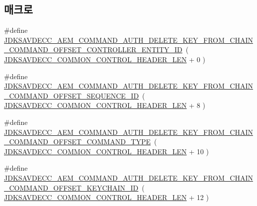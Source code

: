 \subsection*{매크로}
\begin{DoxyCompactItemize}
\item 
\#define \hyperlink{group__command__auth__delete__key__from__chain_ga7f921177819b2036037a722f26fec6b2}{J\+D\+K\+S\+A\+V\+D\+E\+C\+C\+\_\+\+A\+E\+M\+\_\+\+C\+O\+M\+M\+A\+N\+D\+\_\+\+A\+U\+T\+H\+\_\+\+D\+E\+L\+E\+T\+E\+\_\+\+K\+E\+Y\+\_\+\+F\+R\+O\+M\+\_\+\+C\+H\+A\+I\+N\+\_\+\+C\+O\+M\+M\+A\+N\+D\+\_\+\+O\+F\+F\+S\+E\+T\+\_\+\+C\+O\+N\+T\+R\+O\+L\+L\+E\+R\+\_\+\+E\+N\+T\+I\+T\+Y\+\_\+\+ID}~( \hyperlink{group__jdksavdecc__avtp__common__control__header_gaae84052886fb1bb42f3bc5f85b741dff}{J\+D\+K\+S\+A\+V\+D\+E\+C\+C\+\_\+\+C\+O\+M\+M\+O\+N\+\_\+\+C\+O\+N\+T\+R\+O\+L\+\_\+\+H\+E\+A\+D\+E\+R\+\_\+\+L\+EN} + 0 )
\item 
\#define \hyperlink{group__command__auth__delete__key__from__chain_ga7d21fc8abc9bc6a09a5f635caec467b1}{J\+D\+K\+S\+A\+V\+D\+E\+C\+C\+\_\+\+A\+E\+M\+\_\+\+C\+O\+M\+M\+A\+N\+D\+\_\+\+A\+U\+T\+H\+\_\+\+D\+E\+L\+E\+T\+E\+\_\+\+K\+E\+Y\+\_\+\+F\+R\+O\+M\+\_\+\+C\+H\+A\+I\+N\+\_\+\+C\+O\+M\+M\+A\+N\+D\+\_\+\+O\+F\+F\+S\+E\+T\+\_\+\+S\+E\+Q\+U\+E\+N\+C\+E\+\_\+\+ID}~( \hyperlink{group__jdksavdecc__avtp__common__control__header_gaae84052886fb1bb42f3bc5f85b741dff}{J\+D\+K\+S\+A\+V\+D\+E\+C\+C\+\_\+\+C\+O\+M\+M\+O\+N\+\_\+\+C\+O\+N\+T\+R\+O\+L\+\_\+\+H\+E\+A\+D\+E\+R\+\_\+\+L\+EN} + 8 )
\item 
\#define \hyperlink{group__command__auth__delete__key__from__chain_gaf75b2a3f00a68b96e28ed1c660c8696f}{J\+D\+K\+S\+A\+V\+D\+E\+C\+C\+\_\+\+A\+E\+M\+\_\+\+C\+O\+M\+M\+A\+N\+D\+\_\+\+A\+U\+T\+H\+\_\+\+D\+E\+L\+E\+T\+E\+\_\+\+K\+E\+Y\+\_\+\+F\+R\+O\+M\+\_\+\+C\+H\+A\+I\+N\+\_\+\+C\+O\+M\+M\+A\+N\+D\+\_\+\+O\+F\+F\+S\+E\+T\+\_\+\+C\+O\+M\+M\+A\+N\+D\+\_\+\+T\+Y\+PE}~( \hyperlink{group__jdksavdecc__avtp__common__control__header_gaae84052886fb1bb42f3bc5f85b741dff}{J\+D\+K\+S\+A\+V\+D\+E\+C\+C\+\_\+\+C\+O\+M\+M\+O\+N\+\_\+\+C\+O\+N\+T\+R\+O\+L\+\_\+\+H\+E\+A\+D\+E\+R\+\_\+\+L\+EN} + 10 )
\item 
\#define \hyperlink{group__command__auth__delete__key__from__chain_gac6246c3e92af99eb838bdc996829ada2}{J\+D\+K\+S\+A\+V\+D\+E\+C\+C\+\_\+\+A\+E\+M\+\_\+\+C\+O\+M\+M\+A\+N\+D\+\_\+\+A\+U\+T\+H\+\_\+\+D\+E\+L\+E\+T\+E\+\_\+\+K\+E\+Y\+\_\+\+F\+R\+O\+M\+\_\+\+C\+H\+A\+I\+N\+\_\+\+C\+O\+M\+M\+A\+N\+D\+\_\+\+O\+F\+F\+S\+E\+T\+\_\+\+K\+E\+Y\+C\+H\+A\+I\+N\+\_\+\+ID}~( \hyperlink{group__jdksavdecc__avtp__common__control__header_gaae84052886fb1bb42f3bc5f85b741dff}{J\+D\+K\+S\+A\+V\+D\+E\+C\+C\+\_\+\+C\+O\+M\+M\+O\+N\+\_\+\+C\+O\+N\+T\+R\+O\+L\+\_\+\+H\+E\+A\+D\+E\+R\+\_\+\+L\+EN} + 12 )

\end{DoxyCompactItemize}
